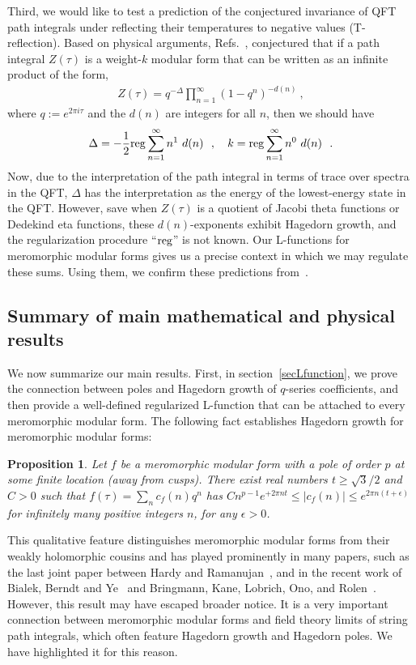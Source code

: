 \documentclass[11pt,a4paper]{article}
\newcommand{\e}{\epsilon}
\newtheorem{prop}[thm]{Proposition}
\newcommand{\reg}{{\rm reg}}
\begin{document}
Third, we would like to test a prediction of the conjectured invariance of QFT path integrals under reflecting their temperatures to negative values (T-reflection). Based on physical arguments, Refs.~\cite{14T-rex0, 06T-rex1}, conjectured that if a path integral $Z(\tau)$ is a weight-$k$ modular form that can be written as an infinite product of the form,
\begin{align}
Z(\tau) = q^{-\Delta} \prod_{n = 1}^{\infty} (1-q^n)^{-d(n)}~,
\end{align}
where $q := e^{2 \pi i \tau}$ and the $d(n)$ are integers for all $n$, then we should have
\begin{align}
\Delta = -\frac{1}{2} \reg \sum_{n = 1}^{\infty} n^1~d(n)~~,~~
~k = \reg\sum_{n = 1}^{\infty} n^0~d(n)~~.
\end{align}
Now, due to the interpretation of the path integral in terms of trace over spectra in the QFT, $\Delta$ has the interpretation as the energy of the lowest-energy state in the QFT. However, save when $Z(\tau)$ is a quotient of Jacobi theta functions or Dedekind eta functions, these $d(n)$-exponents exhibit Hagedorn growth, and the regularization procedure ``$\reg$'' is not known. Our L-functions for meromorphic modular forms gives us a precise context in which we may regulate these sums. Using them, we confirm these predictions from~\cite{14T-rex0, 06T-rex1}.

\subsection{Summary of main mathematical and physical results}

We now summarize our main results. First, in section~\ref{secLfunction}, we prove the connection between poles and Hagedorn growth of $q$-series coefficients, and then provide a well-defined regularized L-function that can be attached to every meromorphic modular form. The following fact establishes Hagedorn growth for meromorphic modular forms:

\begin{prop}
\label{Prop1}
Let $f$ be a meromorphic modular form with a pole of order $p$ at some finite location (away from cusps). There exist real numbers $t \geq \sqrt{3}/2$ and $C > 0$ such that $f(\tau) = \sum_n c_f(n) q^n$ has $C n^{p-1} e^{+2 \pi n t} \leq |c_f(n)| \leq e^{2 \pi n (t+\e)}$ for infinitely many positive integers $n$, for any $\e > 0$.
\end{prop}

This qualitative feature distinguishes meromorphic modular forms from their weakly holomorphic cousins and has played prominently in many papers, such as the last joint paper between Hardy and Ramanujan~\cite{15-HR1919}, and in the recent work of Bialek, Berndt and Ye~\cite{16-BialekPol1, 17-BialekPol2, 18-BialekPol3} and Bringmann, Kane, Lobrich, Ono, and Rolen~\cite{19-KolnPol1, 20-KolnPol2, 21-DivisorsMF1}. However, this result may have escaped broader notice. It is a very important connection between meromorphic modular forms and field theory limits of string path integrals, which often feature Hagedorn growth and Hagedorn poles. We have highlighted it for this reason.
\end{document}
